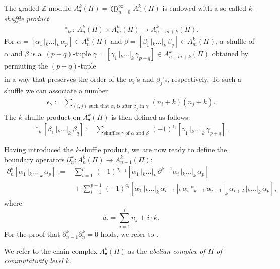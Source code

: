\documentclass[pdftex]{sigma}
\numberwithin{equation}{section}
\newcommand{\ZZ }{\mathbb{Z}}
\begin{document}
The graded $\ZZ$-module $A^k_\bullet(\Pi)=\bigoplus_{n=0}^\infty \, A^k_n(\Pi)$ is endowed with a so-called {\it $k$-shuffle product}
\begin{align*}
 \ast_k\colon \ A^k_n(\Pi) \times A^k_m(\Pi) \to A^k_{n+m+k}(\Pi).
\end{align*}
For $\alpha=[\alpha_1 \, |_k \dots |_k \, \alpha_p] \in A^k_n(\Pi)$ and $\beta =[\beta_1 \, |_k \dots |_k \, \beta_q] \in A^k_m(\Pi)$, a~shuffle of $\alpha$ and $\beta$ is a~$(p+q)$-tuple $\gamma=[\gamma_1 \, |_k \dots |_k \, \gamma_{p+q}] \in A^k_{n+m+k}(\Pi)$ obtained by permuting the $(p+q)$-tuple
\begin{align*}
 [\alpha_1 \, |_k \dots |_k \, \alpha_p \, |_k \,\beta_1 \, |_k \dots |_k \, \beta_q]
\end{align*}
in a way that preserves the order of the $\alpha_i$'s and $\beta_j$'s, respectively. To such a shuffle we can associate a number
\begin{align*}
 \epsilon_\gamma:= \sum_{\text{$(i,j)$ such that $\alpha_i$ is after $\beta_j$ in $\gamma$}} \, (n_i+k)(n_j+k).
\end{align*}
The $k$-shuffle product on $A^k_\bullet(\Pi)$ is then defined as follows:
\begin{align*}
 [\alpha_1 \, |_k \dots |_k \, \alpha_p] \ast_k [\beta_1 \, |_k \dots |_k \, \beta_q] := \sum_{\text{shuffles $\gamma$ of $\alpha$ and $\beta$}} \, (-1)^{\epsilon_\gamma}[\gamma_1 \, |_k \dots |_k \, \gamma_{p+q}].
\end{align*}

Having introduced the $k$-shuffle product, we are now ready to define the boundary operators $\partial^k_n\colon A^k_n(\Pi) \to A^k_{n-1}(\Pi)$:
\begin{align}
 \partial^k_n[\alpha_1 \, |_k \dots |_k \,\alpha_p]:=&{} \sum_{i=1}^p \, (-1)^{a_{i-1}}[\alpha_1 \, |_k \dots |_k \, \partial^{k-1}\alpha_i \, |_k \dots |_k \, \alpha_p]\nonumber\\
 &{}+\sum_{i=1}^{p-1}\,(-1)^{a_i}[\alpha_1 \, |_k \dots |_k \,\alpha_{i-1} \, |_k \, \alpha_i \ast_{k-1} \alpha_{i+1} \, |_k \, \alpha_{i+2} \, |_k \dots |_k \, \alpha_p],\label{def: boundary operator of abelian chains}
\end{align}
where
\[
a_i=\sum_{j=1}^i  n_j + i\cdot k.
\] For the proof that $\partial^k_{n-1}\partial^k_n = 0$ holds, we refer to \cite{Eilenberg1950a}.

We refer to the chain complex $A^k_\bullet(\Pi)$ as the {\it abelian complex of $\Pi$ of commutativity level $k$}.
\end{document}
